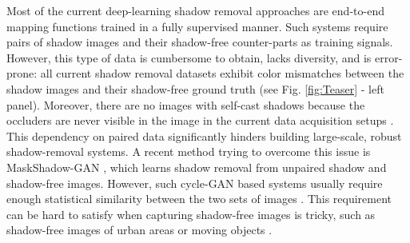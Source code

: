 \documentclass[runningheads]{llncs}
\begin{document}
Most of the current deep-learning  shadow removal approaches are  end-to-end mapping functions trained in a fully supervised manner. Such systems require pairs of shadow images and their shadow-free counter-parts as training signals. However, this type of data is cumbersome to obtain, lacks diversity, and is error-prone: all current shadow removal datasets exhibit color mismatches between the shadow images and their shadow-free ground truth (see Fig. \ref{fig:Teaser} - left panel). Moreover, there are no images with self-cast shadows because the occluders are never visible in the image in the  current data acquisition setups \cite{Wang_2018_CVPR,Qu_2017_CVPR,hu_iccv2019mask}.
This dependency on paired data significantly hinders  building  large-scale,  robust shadow-removal systems. A recent method trying to overcome this issue is  MaskShadow-GAN \cite{hu_iccv2019mask}, which learns shadow removal from unpaired shadow and shadow-free images. However, such  cycle-GAN \cite{CycleGAN2017} based systems usually require enough statistical similarity between the two sets of images \cite{Li2019AsymmetricGF,Choi2017StarGANUG}. This requirement can be hard to satisfy when capturing shadow-free images is tricky, such as shadow-free images of urban areas \cite{Shadow_Urban} or moving objects \cite{Shadow_tracking,Prati2003DetectingMS}.
\end{document}
